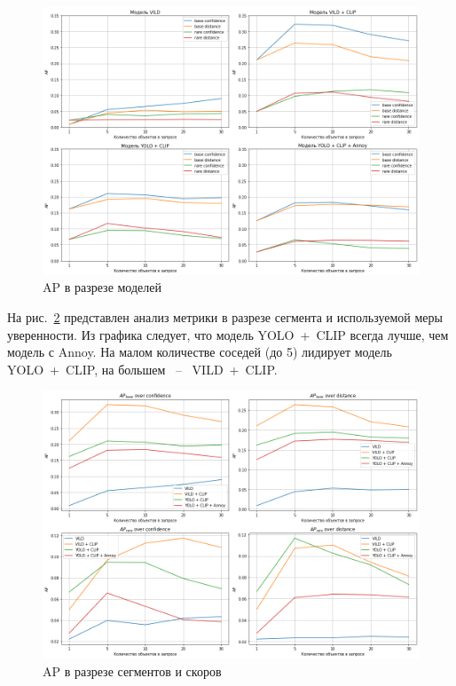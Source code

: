 \documentclass[a4paper,14pt]{article}
\begin{document}
    \begin{figure}[H]
        \centering
        \includegraphics[width=0.999\linewidth]{images/average_precision_dataset}
        \caption{AP в разрезе моделей}
        \label{fig:average_precision_dataset}
    \end{figure}

    На рис.~\ref{fig:average_precision_metrics} представлен анализ метрики в разрезе сегмента и используемой меры уверенности.
    Из графика следует, что модель YOLO~+~CLIP всегда лучше, чем модель с Annoy.
    На малом количестве соседей (до 5) лидирует модель YOLO~+~CLIP, на большем ~--~ VILD~+~CLIP.

    \begin{figure}[H]
        \centering
        \includegraphics[width=0.999\linewidth]{images/average_precision_metrics}
        \caption{AP в разрезе сегментов и скоров}
        \label{fig:average_precision_metrics}
    \end{figure}
\end{document}
